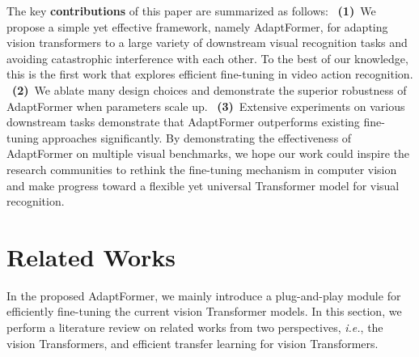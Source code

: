 The key \textbf{contributions} of this paper are summarized as follows:
~\textbf{(1)}~We propose a simple yet effective framework, namely AdaptFormer, for adapting vision transformers to a large variety of downstream visual recognition tasks and avoiding catastrophic interference with each other. To the best of our knowledge, this is the first work that explores efficient fine-tuning in video action recognition.
~\textbf{(2)}~We ablate many design choices and demonstrate the superior robustness of AdaptFormer when parameters scale up.
~\textbf{(3)}~Extensive experiments on various downstream tasks demonstrate that AdaptFormer outperforms existing fine-tuning approaches significantly. By demonstrating the effectiveness of AdaptFormer on multiple visual benchmarks, we hope our work could inspire the research communities to rethink the fine-tuning mechanism in computer vision and make progress toward a flexible yet universal Transformer model for visual recognition. 

\section{Related Works}

In the proposed AdaptFormer, we mainly introduce a plug-and-play module for efficiently fine-tuning the current vision Transformer models. In this section, we perform a literature review on related works from two perspectives, \emph{i.e.}, the vision Transformers, and efficient transfer learning for vision Transformers. 

